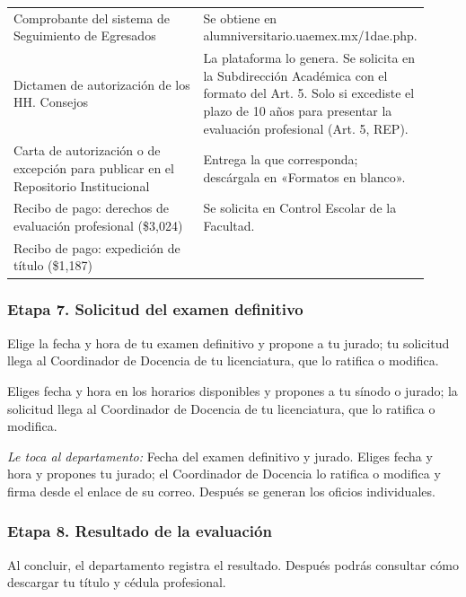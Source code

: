 {\begin{longtable}{>{\raggedright\arraybackslash}p{0.47\linewidth}>{\raggedright\arraybackslash}p{0.45\linewidth}}
Comprobante del sistema de Seguimiento de Egresados & Se obtiene en alumniversitario.uaemex.mx/1dae.php.\\
Dictamen de autorización de los HH. Consejos & La plataforma lo genera. Se solicita en la Subdirección Académica con el formato del Art. 5. Solo si excediste el plazo de 10 años para presentar la evaluación profesional (Art. 5, REP).\\
Carta de autorización o de excepción para publicar en el Repositorio Institucional & Entrega la que corresponda; descárgala en «Formatos en blanco».\\
Recibo de pago: derechos de evaluación profesional (\$3,024) & Se solicita en Control Escolar de la Facultad.\\
Recibo de pago: expedición de título (\$1,187) & \\
\bottomrule
\end{longtable}}
\subsubsection*{Etapa 7. Solicitud del examen definitivo}
Elige la fecha y hora de tu examen definitivo y propone a tu jurado; tu solicitud llega al Coordinador de Docencia de tu licenciatura, que lo ratifica o modifica.

Eliges fecha y hora en los horarios disponibles y propones a tu sínodo o jurado; la solicitud llega al Coordinador de Docencia de tu licenciatura, que lo ratifica o modifica.

\emph{Le toca al departamento:} Fecha del examen definitivo y jurado. Eliges fecha y hora y propones tu jurado; el Coordinador de Docencia lo ratifica o modifica y firma desde el enlace de su correo. Después se generan los oficios individuales.
\subsubsection*{Etapa 8. Resultado de la evaluación}
Al concluir, el departamento registra el resultado. Después podrás consultar cómo descargar tu título y cédula profesional.

